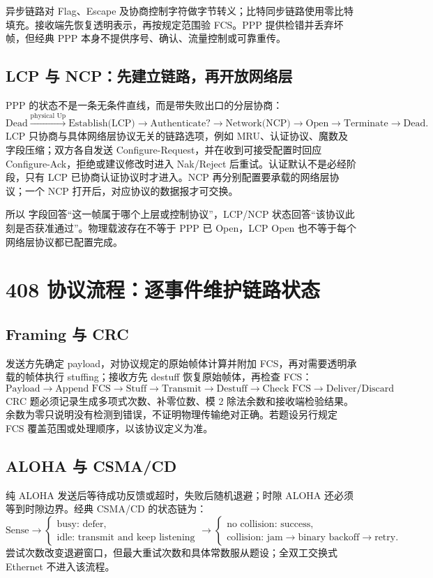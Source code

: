 \documentclass[UTF8,fontset=none,11pt,a4paper]{ctexart}
\begin{document}
异步链路对 Flag、Escape 及协商控制字符做字节转义；比特同步链路使用零比特填充。接收端先恢复透明表示，再按规定范围验 FCS。PPP 提供检错并丢弃坏帧，但经典 PPP 本身不提供序号、确认、流量控制或可靠重传。

\subsection{LCP 与 NCP：先建立链路，再开放网络层}

PPP 的状态不是一条无条件直线，而是带失败出口的分层协商：
\[
\text{Dead}\xrightarrow{\text{physical Up}}
\text{Establish(LCP)}\to
\text{Authenticate?}\to
\text{Network(NCP)}\to
\text{Open}\to\text{Terminate}\to\text{Dead}.
\]
LCP 只协商与具体网络层协议无关的链路选项，例如 MRU、认证协议、魔数及字段压缩；双方各自发送 Configure-Request，并在收到可接受配置时回应 Configure-Ack，拒绝或建议修改时进入 Nak/Reject 后重试。认证默认不是必经阶段，只有 LCP 已协商认证协议时才进入。NCP 再分别配置要承载的网络层协议；一个 NCP 打开后，对应协议的数据报才可交换。

所以  字段回答“这一帧属于哪个上层或控制协议”，LCP/NCP 状态回答“该协议此刻是否获准通过”。物理载波存在不等于 PPP 已 Open，LCP Open 也不等于每个网络层协议都已配置完成。

\section{408 协议流程：逐事件维护链路状态}

\subsection{Framing 与 CRC}

发送方先确定 payload，对协议规定的原始帧体计算并附加 FCS，再对需要透明承载的帧体执行 stuffing；接收方先 destuff 恢复原始帧体，再检查 FCS：
\[
\boxed{\text{Payload}\to\text{Append FCS}\to\text{Stuff}\to\text{Transmit}
\to\text{Destuff}\to\text{Check FCS}\to\text{Deliver/Discard}}.
\]
CRC 题必须记录生成多项式次数、补零位数、模 2 除法余数和接收端检验结果。余数为零只说明没有检测到错误，不证明物理传输绝对正确。若题设另行规定 FCS 覆盖范围或处理顺序，以该协议定义为准。

\subsection{ALOHA 与 CSMA/CD}

纯 ALOHA 发送后等待成功反馈或超时，失败后随机退避；时隙 ALOHA 还必须等到时隙边界。经典 CSMA/CD 的状态链为：
\[
\text{Sense}\to
\begin{cases}
\text{busy: defer},\\
\text{idle: transmit and keep listening}
\end{cases}
\to
\begin{cases}
\text{no collision: success},\\
\text{collision: jam}\to\text{binary backoff}\to\text{retry}.
\end{cases}
\]
尝试次数改变退避窗口，但最大重试次数和具体常数服从题设；全双工交换式 Ethernet 不进入该流程。
\end{document}
